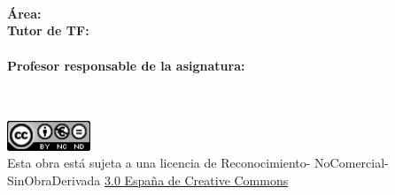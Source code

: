 {{\begin{minipage}[b][17cm][t]{11.4cm}
    \flushleft
    \hspace{0pt}\\
    \Huge
    \textbf{\@autor}\\\vspace{\fill}
    \@programa\\\vspace{\fill}
    \textbf{Área:} \@area\\\vspace{\fill}
    \textbf{Tutor de TF:}\\
    \@tutor\\\vspace{\fill}
    \textbf{Profesor responsable de la asignatura:}\\
    \@profesor\\\vspace{\fill}
    \@fecha\\\vspace{\fill}
    \end{minipage}
    }
    
    \clearpage
    \restoregeometry

    \vspace*{\fill}
    \noindent
    \begin{minipage}{12cm}
    \flushleft
    \includegraphics[width= 2.5cm]{Figuras/cc.png}\\
    Esta obra está sujeta a una licencia de Reconocimiento- NoComercial-SinObraDerivada \href{https://creativecommons.org/licenses/by-nc-nd/3.0/es/}{3.0 España de Creative Commons}
    \end{minipage}
    \vspace{2cm}

    \newpage

}
